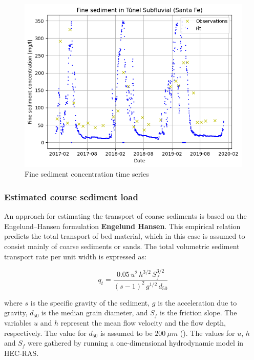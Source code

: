 \begin{figure}[H]
    \centering
    \includegraphics[width=0.5\linewidth]{figures/ch6/fine sediment concentrations.png}
    \caption{Fine sediment concentration time series}
    \label{fig:timeseries fine sediments}
\end{figure}



\subsubsection{Estimated course sediment load}
An approach for estimating the transport of coarse sediments is based on the Engelund–Hansen formulation \textbf{Engelund Hansen}. This empirical relation predicts the total transport of bed material, which in this case is assumed to consist mainly of coarse sediments or sands. The total volumetric sediment transport rate per unit width is expressed as:

\begin{equation}
    q_{t} = \frac{0.05\,u^{2}\,h^{3/2}\,S_{f}^{3/2}}{(s - 1)^{2}\,g^{1/2}\,d_{50}}
    \label{eq:engelund_hansen}
\end{equation}

where \( s \) is the specific gravity of the sediment, \( g \) is the acceleration due to gravity, \( d_{50} \) is the median grain diameter, and \( S_{f} \) is the friction slope. The variables \( u \) and \( h \) represent the mean flow velocity and the flow depth, respectively. The value for $d_{50}$ is assumed to be $200 ~\mu m$ (\cite{reMETODOLOGIAPARAGENERACION2009}). The values for $u$, $h$ and $S_f$ were gathered by running a one-dimensional hydrodynamic model in HEC-RAS. 






